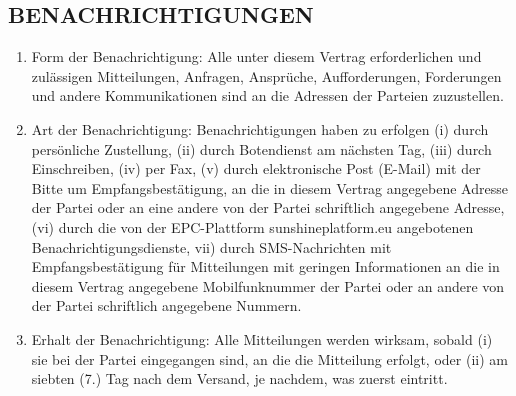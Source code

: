 \begin{multicols}{2}
   \subsection{BENACHRICHTIGUNGEN}
   \begin{enumerate}
   \item Form der Benachrichtigung: Alle unter diesem Vertrag erforderlichen und zulässigen Mitteilungen, Anfragen, Ansprüche, Aufforderungen, Forderungen und andere Kommunikationen sind an die Adressen der Parteien zuzustellen.
   \item Art der Benachrichtigung: Benachrichtigungen haben zu erfolgen (i) durch persönliche Zustellung, (ii) durch Botendienst am nächsten Tag, (iii) durch Einschreiben, (iv) per Fax, (v) durch elektronische Post (E-Mail) mit der Bitte um Empfangsbestätigung, an die in diesem Vertrag angegebene Adresse der Partei oder an eine andere von der Partei schriftlich angegebene Adresse, (vi) durch die von der EPC-Plattform sunshineplatform.eu angebotenen Benachrichtigungsdienste, vii) durch SMS-Nachrichten mit Empfangsbestätigung für Mitteilungen mit geringen Informationen  an die in diesem Vertrag angegebene Mobilfunknummer der Partei oder an andere von der Partei schriftlich angegebene Nummern.
   \item Erhalt der Benachrichtigung: Alle Mitteilungen werden wirksam, sobald (i) sie bei der Partei eingegangen sind, an die die Mitteilung erfolgt, oder (ii) am siebten (7.) Tag nach dem Versand, je nachdem, was zuerst eintritt.
   \end{enumerate}

\end{multicols}
